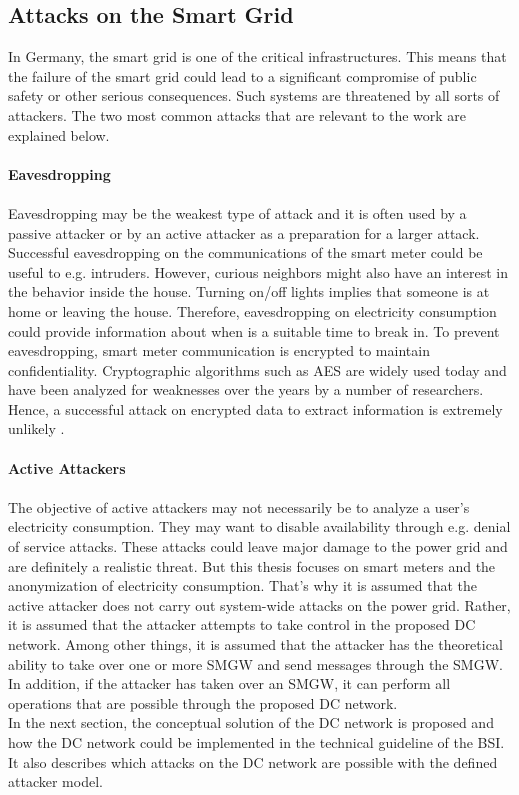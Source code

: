 \subsection{Attacks on the Smart Grid}
\label{subsec:attacks}
In Germany, the smart grid is one of the critical infrastructures. This means that the failure of the smart grid could lead to a significant compromise of public safety or other serious consequences. Such systems are threatened by all sorts of attackers. The two most common attacks that are relevant to the work are explained below.
\\
\\
\textbf{Eavesdropping}
\\
\\
Eavesdropping may be the weakest type of attack and it is often used by a passive attacker or by an active attacker as a preparation for a larger attack. Successful eavesdropping on the communications of the smart meter could be useful to e.g. intruders. However, curious neighbors might also have an interest in the behavior inside the house. Turning on/off lights implies that someone is at home or leaving the house. Therefore, eavesdropping on electricity consumption could provide information about when is a suitable time to break in. To prevent eavesdropping, smart meter communication is encrypted to maintain confidentiality. Cryptographic algorithms such as AES are widely used today and have been analyzed for weaknesses over the years by a number of researchers. Hence, a successful attack on encrypted data to extract information is extremely unlikely \cite{lemay2007unified}.
\\
\\
\textbf{Active Attackers}
\\
\\
The objective of active attackers may not necessarily be to analyze a user's electricity consumption. They may want to disable availability through e.g. denial of service attacks. These attacks could leave major damage to the power grid and are definitely a realistic threat. But this thesis focuses on smart meters and the anonymization of electricity consumption. That's why it is assumed that the active attacker does not carry out system-wide attacks on the power grid. Rather, it is assumed that the attacker attempts to take control in the proposed DC network. Among other things, it is assumed that the attacker has the theoretical ability to take over one or more SMGW and send messages through the SMGW. In addition, if the attacker has taken over an SMGW, it can perform all operations that are possible through the proposed DC network.\\In the next section, the conceptual solution of the DC network is proposed and how the DC network could be implemented in the technical guideline of the BSI. It also describes which attacks on the DC network are possible with the defined attacker model.

\clearpage

